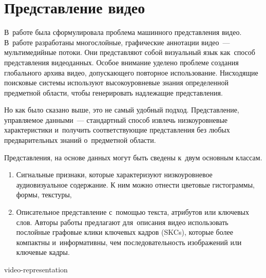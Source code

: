 
\section{Представление видео}


В~работе \cite{Haase:95} была сформулировала проблема
машинного представления видео.
В~работе \cite{Chih-Wen:2007} разработаны многослойные,
графические аннотации видео~— мультимедийные
потоки.
Они представляют собой визуальный язык
как~способ представления видеоданных. Особое внимание уделено
проблеме создания глобального архива видео,
допускающего повторное использование.
Нисходящие поисковые системы используют высокоуровневые знания определенной
предметной области, чтобы генерировать надлежащие представления.

Но как было сказано выше, это не самый удобный подход.
Представление, управляемое данными~— стандартный способ извлечь
низкоуровневые характеристики и~получить соответствующие представления
без любых предварительных знаний о~предметной области.

Представления, на основе данных могут быть сведены к~двум основным классам.
\begin{enumerate}
    \item Сигнальные признаки, которые характеризуют низкоуровневое
        аудиовизуальное содержание. К ним можно отнести
        цветовые гистограммы, формы, текстуры,
    \item Описательное представление с~помощью текста, атрибутов или ключевых слов.
        Авторы работы \cite{Xiangang:2011} предлагают для~описания
        видео использовать послойные графовые клики ключевых кадров
        (SKCs), которые более компактны и~информативны,
        чем последовательность изображений или ключевые кадры.
\end{enumerate}



\begin{figuredt}
    {video-representation}
\end{figuredt}

